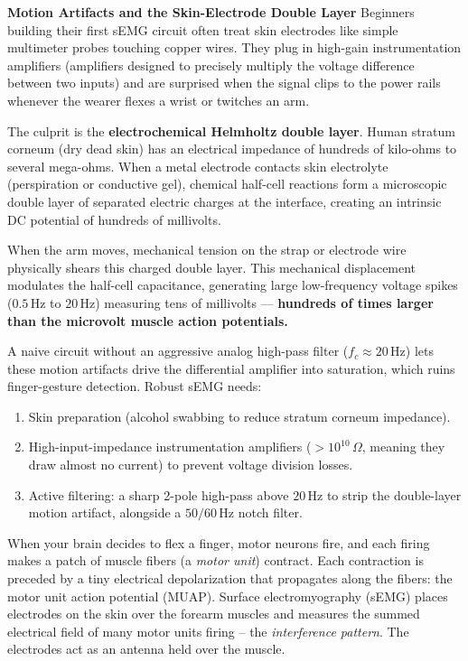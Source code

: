 \begin{trapbox}
\textbf{Motion Artifacts and the Skin-Electrode Double Layer}
Beginners building their first sEMG circuit often treat skin electrodes like simple multimeter probes touching copper wires. They plug in high-gain instrumentation amplifiers (amplifiers designed to precisely multiply the voltage difference between two inputs) and are surprised when the signal clips to the power rails whenever the wearer flexes a wrist or twitches an arm.

The culprit is the \textbf{electrochemical Helmholtz double layer}. Human stratum corneum (dry dead skin) has an electrical impedance of hundreds of kilo-ohms to several mega-ohms. When a metal electrode contacts skin electrolyte (perspiration or conductive gel), chemical half-cell reactions form a microscopic double layer of separated electric charges at the interface, creating an intrinsic DC potential of hundreds of millivolts.

When the arm moves, mechanical tension on the strap or electrode wire physically shears this charged double layer. This mechanical displacement modulates the half-cell capacitance, generating large low-frequency voltage spikes ($0.5\,\text{Hz}$ to $20\,\text{Hz}$) measuring tens of millivolts --- \textbf{hundreds of times larger than the microvolt muscle action potentials.} 

A naive circuit without an aggressive analog high-pass filter ($f_c \approx 20\,\text{Hz}$) lets these motion artifacts drive the differential amplifier into saturation, which ruins finger-gesture detection. Robust sEMG needs:
\begin{enumerate}
  \item Skin preparation (alcohol swabbing to reduce stratum corneum impedance).
  \item High-input-impedance instrumentation amplifiers ($>10^{10}\,\Omega$, meaning they draw almost no current) to prevent voltage division losses.
  \item Active filtering: a sharp 2-pole high-pass above $20\,\text{Hz}$ to strip the double-layer motion artifact, alongside a $50/60\,\text{Hz}$ notch filter.
\end{enumerate}
\end{trapbox}

When your brain decides to flex a finger, motor neurons fire, and each firing makes a
patch of muscle fibers (a \emph{motor unit}) contract. Each contraction is preceded
by a tiny electrical depolarization that propagates along the fibers: the motor unit
action potential (MUAP). Surface electromyography (sEMG) places electrodes on the
skin over the forearm muscles and measures the summed electrical field of many motor
units firing -- the \emph{interference pattern}. The electrodes act as an antenna
held over the muscle.

